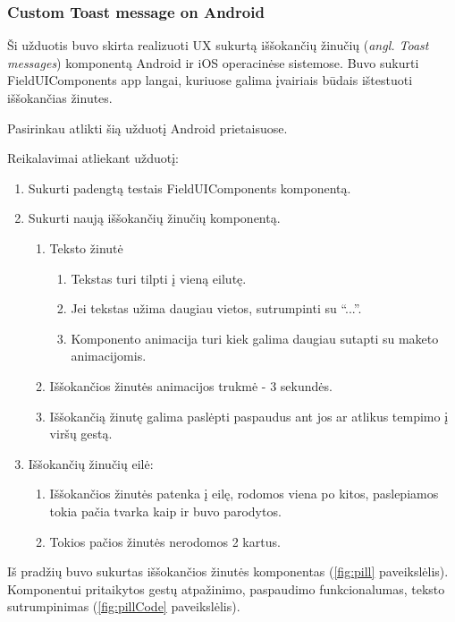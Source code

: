 \newpage
\subsubsection{Custom Toast message on Android}
Ši užduotis buvo skirta realizuoti UX sukurtą iššokančių žinučių (\emph{angl. Toast messages}) komponentą Android ir iOS operacinėse sistemose. 
Buvo sukurti FieldUIComponents app langai, kuriuose galima įvairiais būdais ištestuoti iššokančias žinutes.

Pasirinkau atlikti šią užduotį Android prietaisuose. 

Reikalavimai atliekant užduotį:
\begin{enumerate}
    \item Sukurti padengtą testais FieldUIComponents komponentą.
    \item Sukurti naują iššokančių žinučių komponentą.
    \begin{enumerate}
        \item Teksto žinutė
        \begin{enumerate}
            \item Tekstas turi tilpti į vieną eilutę.
            \item Jei tekstas užima daugiau vietos, sutrumpinti su \enquote{...}.
            \item Komponento animacija turi kiek galima daugiau sutapti su maketo animacijomis.
        \end{enumerate}
        \item Iššokančios žinutės animacijos trukmė - 3 sekundės.
        \item Iššokančią žinutę galima paslėpti paspaudus ant jos ar atlikus tempimo į viršų gestą.
    \end{enumerate}
    \item Iššokančių žinučių eilė:
    \begin{enumerate}
        \item Iššokančios žinutės patenka į eilę, rodomos viena po kitos, paslepiamos tokia pačia tvarka kaip ir buvo parodytos.
        \item Tokios pačios žinutės nerodomos 2 kartus.
    \end{enumerate}
\end{enumerate}
\newpage
Iš pradžių buvo sukurtas iššokančios žinutės komponentas (\ref{fig:pill} paveikslėlis). Komponentui pritaikytos gestų atpažinimo, paspaudimo funkcionalumas, teksto sutrumpinimas (\ref{fig:pillCode} paveikslėlis).

